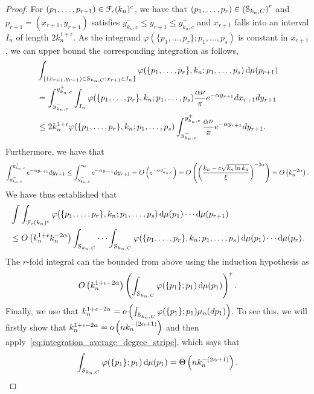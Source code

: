 \begin{proof}
For $(p_1,\dots,p_{r+1})\in \mathcal{F}_\epsilon(k_n)^c$, we have that $(p_1,\dots,p_r) \in \left(\mathcal{S}_{k_n,C}\right)^r$ and $p_{r+1}=(x_{r+1},y_{r+1})$ satisfies $y_{k_n,c}^-\leq y_{r+1}\leq y_{k_n,c}^+$ and $x_{r+1}$ falls into an interval $I_n$ of length $2k_n^{1+\epsilon}$.
As the integrand $\varphi(\{p_1,\dots,p_r\};p_1,\dots,p_s)$ is constant in $x_{r+1}$, we can upper bound the corresponding integration as follows,
\begin{align*}
	&\int_{\{(x_{r+1},y_{r+1})\in\mathcal{S}_{k_n,C}: x_{r+1}\in I_n\}} \varphi(\{p_1,\dots,p_r\}, k_n ;p_1,\dots,p_s) 
		\operatorname{\mathrm{d}\hspace{-2pt}} \mu(p_{r+1}) \\
	&= \int_{y_{k_n,c}^-}^{y_{k_n,c}^+} \int_{I_n} \varphi(\{p_1,\dots,p_r\}, k_n ;p_1,\dots,p_s)\frac{\alpha \nu}{\pi} e^{-\alpha y_{r+1}} dx_{r+1}dy_{r+1} \\
	&\leq 2k_n^{1+\epsilon} \varphi(\{p_1,\dots,p_r\}, k_n ;p_1,\dots,p_s)\int_{y_{k_n,c}^-}^{y_{k_n,c}^+}  \frac{\alpha \nu}{\pi} e^{-\alpha y_{r+1}} dy_{r+1}.
\end{align*}
Furthermore, we have that
\begin{align*}
	\int_{y_{k_n,c}^-}^{y_{k_n,c}^+} e^{-\alpha y_{r+1}}dy_{r+1} 
	\leq \int_{y_{k_n,c}^-}^\infty e^{-\alpha y_{r+1}}dy_{r+1} 
	= O\left(e^{-\alpha y_{k_n,c}^-}\right) = O\left(\left( \frac{k_n-c\sqrt{k_n\ln k_n}}{\xi}\right)^{-2\alpha}\right) 
	= O\left(k_n^{-2\alpha}\right).
\end{align*}
We have thus established that
\begin{align*}
	&\int \int_{\mathcal{F}_\epsilon(k_n)^c} \varphi(\{p_1,\dots,p_r\}, k_n ;p_1,\dots,p_s)
		\operatorname{\mathrm{d}\hspace{-2pt}} \mu(p_1) \cdots \operatorname{\mathrm{d}\hspace{-2pt}} \mu(p_{r+1})\\
	&\leq O\left(k_n^{1+\epsilon} k_n^{-2\alpha}\right)\int_{\mathcal{S}_{k_n,C}} \cdots \int_{\mathcal{S}_{k_n,C}} 
		\varphi(\{p_1,\dots,p_r\}, k_n ;p_1,\dots,p_s) \operatorname{\mathrm{d}\hspace{-2pt}} \mu(p_1) \cdots \operatorname{\mathrm{d}\hspace{-2pt}} \mu(p_{r}).
\end{align*}
The $r$-fold integral can the bounded from above using the induction hypothesis as
\begin{align}\label{eq:indhyp}
	O\left(k_n^{1+\epsilon-2\alpha}\right)\left(\int_{\mathcal{S}_{k_n,C}} \varphi(\{p_1\};p_1) \operatorname{\mathrm{d}\hspace{-2pt}} \mu(p_1) \right)^r .
\end{align}
Finally, we use that $k_n^{1+\epsilon-2\alpha} = o\left(\int_{\mathcal{S}_{k_n,C}} \varphi(\{p_1\};p_1)\mu_n(dp_1)\right)$. To see this, we will firstly show that $k_n^{1+\epsilon-2\alpha} = o\left(nk_n^{-(2\alpha+1)}\right)$ and then apply~\eqref{eq:integration_average_degree_stripe}, which says that
\begin{align*}
\int_{\stripknc} \varphi(\{p_1\};p_1) \dd \mu(p_1) = \bigT{n k_n^{-(2\alpha+1)}}.

\end{align*}
\end{proof}
